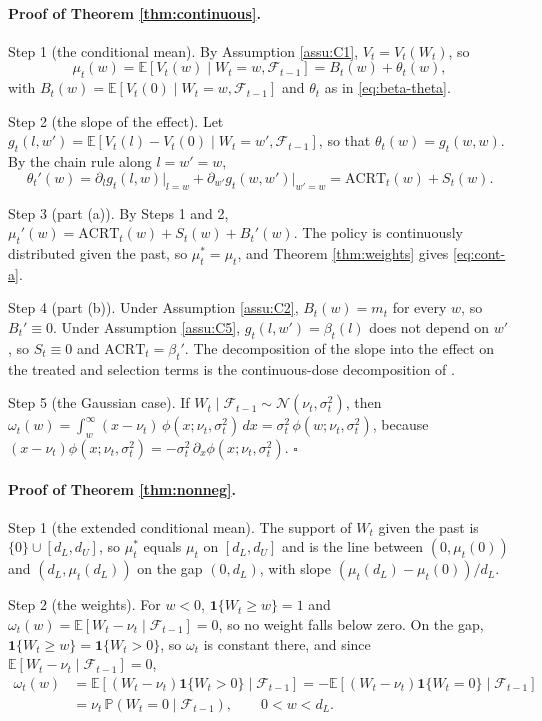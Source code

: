 \documentclass[12pt,a4paper]{article}
\theoremstyle{definition}
\newcommand{\E}{\mathbb{E}}
\begin{document}
\paragraph{Proof of Theorem \ref{thm:continuous}.} Step 1 (the conditional mean). By Assumption \ref{assu:C1}, $V_t=V_t(W_t)$, so
\[
\mu_t(w)=\E[V_t(w)\mid W_t=w,\mathcal{F}_{t-1}]=B_t(w)+\theta_t(w),
\]
with $B_t(w)=\E[V_t(0)\mid W_t=w,\mathcal{F}_{t-1}]$ and $\theta_t$ as in \eqref{eq:beta-theta}.

Step 2 (the slope of the effect). Let $g_t(l,w')=\E[V_t(l)-V_t(0)\mid W_t=w',\mathcal{F}_{t-1}]$, so that $\theta_t(w)=g_t(w,w)$. By the chain rule along $l=w'=w$,
\[
\theta_t'(w)=\partial_lg_t(l,w)\big|_{l=w}+\partial_{w'}g_t(w,w')\big|_{w'=w}=\mathrm{ACRT}_t(w)+S_t(w).
\]

Step 3 (part (a)). By Steps 1 and 2, $\mu_t'(w)=\mathrm{ACRT}_t(w)+S_t(w)+B_t'(w)$. The policy is continuously distributed given the past, so $\mu_t^\ast=\mu_t$, and Theorem \ref{thm:weights} gives \eqref{eq:cont-a}.

Step 4 (part (b)). Under Assumption \ref{assu:C2}, $B_t(w)=m_t$ for every $w$, so $B_t'\equiv0$. Under Assumption \ref{assu:C5}, $g_t(l,w')=\beta_t(l)$ does not depend on $w'$, so $S_t\equiv0$ and $\mathrm{ACRT}_t=\beta_t'$. The decomposition of the slope into the effect on the treated and selection terms is the continuous-dose decomposition of \citet{callawaysantannabacon2021}.

Step 5 (the Gaussian case). If $W_t\mid\mathcal{F}_{t-1}\sim\mathcal{N}(\nu_t,\sigma_t^2)$, then $\omega_t(w)=\int_w^\infty(x-\nu_t)\,\phi(x;\nu_t,\sigma_t^2)\,dx=\sigma_t^2\,\phi(w;\nu_t,\sigma_t^2)$, because $(x-\nu_t)\phi(x;\nu_t,\sigma_t^2)=-\sigma_t^2\,\partial_x\phi(x;\nu_t,\sigma_t^2)$. $\square$

\paragraph{Proof of Theorem \ref{thm:nonneg}.} Step 1 (the extended conditional mean). The support of $W_t$ given the past is $\{0\}\cup[d_L,d_U]$, so $\mu_t^\ast$ equals $\mu_t$ on $[d_L,d_U]$ and is the line between $(0,\mu_t(0))$ and $(d_L,\mu_t(d_L))$ on the gap $(0,d_L)$, with slope $(\mu_t(d_L)-\mu_t(0))/d_L$.

Step 2 (the weights). For $w<0$, $\mathbf{1}\{W_t\geq w\}=1$ and $\omega_t(w)=\E[W_t-\nu_t\mid\mathcal{F}_{t-1}]=0$, so no weight falls below zero. On the gap, $\mathbf{1}\{W_t\geq w\}=\mathbf{1}\{W_t>0\}$, so $\omega_t$ is constant there, and since $\E[W_t-\nu_t\mid\mathcal{F}_{t-1}]=0$,
\[
\begin{aligned}
\omega_t(w)&=\E[(W_t-\nu_t)\mathbf{1}\{W_t>0\}\mid\mathcal{F}_{t-1}]=-\E[(W_t-\nu_t)\mathbf{1}\{W_t=0\}\mid\mathcal{F}_{t-1}]\\
&=\nu_t\,\mathbb{P}(W_t=0\mid\mathcal{F}_{t-1}),\qquad 0<w<d_L .
\end{aligned}
\]
\end{document}
